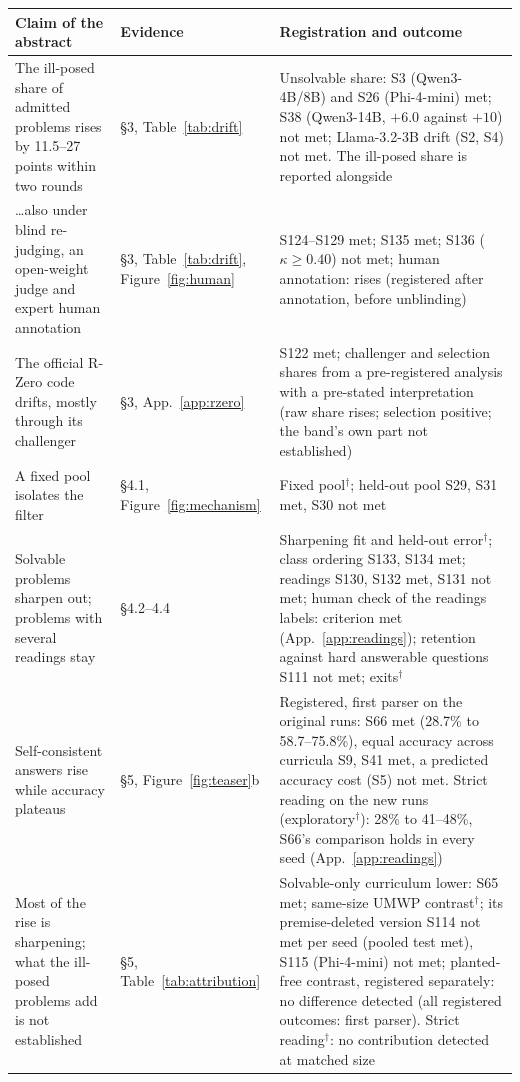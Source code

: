 \begin{table}[tp]
\centering
\small
\setlength{\tabcolsep}{4pt}
\begin{tabular}{p{}p{}p{}}
\toprule
Claim of the abstract & Evidence & Registration and outcome \\
\midrule
The ill-posed share of admitted problems rises by 11.5--27 points within two rounds & \S3, Table~\ref{tab:drift} & Unsolvable share: S3 (Qwen3-4B/8B) and S26 (Phi-4-mini) met; S38 (Qwen3-14B, $+6.0$ against $+10$) not met; Llama-3.2-3B drift (S2, S4) not met. The ill-posed share is reported alongside \\
\ldots also under blind re-judging, an open-weight judge and expert human annotation & \S3, Table~\ref{tab:drift}, Figure~\ref{fig:human} & S124--S129 met; S135 met; S136 ($\kappa \ge 0.40$) not met; human annotation: rises (registered after annotation, before unblinding) \\
The official R-Zero code drifts, mostly through its challenger & \S3, App.~\ref{app:rzero} & S122 met; challenger and selection shares from a pre-registered analysis with a pre-stated interpretation (raw share rises; selection positive; the band's own part not established) \\
A fixed pool isolates the filter & \S4.1, Figure~\ref{fig:mechanism} & Fixed pool$^{\dagger}$; held-out pool S29, S31 met, S30 not met \\
Solvable problems sharpen out; problems with several readings stay & \S4.2--4.4 & Sharpening fit and held-out error$^{\dagger}$; class ordering S133, S134 met; readings S130, S132 met, S131 not met; human check of the readings labels: criterion met (App.~\ref{app:readings}); retention against hard answerable questions S111 not met; exits$^{\dagger}$ \\
Self-consistent answers rise while accuracy plateaus & \S5, Figure~\ref{fig:teaser}b & Registered, first parser on the original runs: S66 met (28.7\% to 58.7--75.8\%), equal accuracy across curricula S9, S41 met, a predicted accuracy cost (S5) not met. Strict reading on the new runs (exploratory$^{\dagger}$): 28\% to 41--48\%, S66's comparison holds in every seed (App.~\ref{app:readings}) \\
Most of the rise is sharpening; what the ill-posed problems add is not established & \S5, Table~\ref{tab:attribution} & Solvable-only curriculum lower: S65 met; same-size UMWP contrast$^{\dagger}$; its premise-deleted version S114 not met per seed (pooled test met), S115 (Phi-4-mini) not met; planted-free contrast, registered separately: no difference detected (all registered outcomes: first parser). Strict reading$^{\dagger}$: no contribution detected at matched size \\

\end{tabular}
\end{table}

